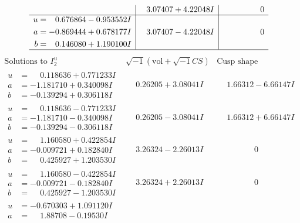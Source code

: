 \documentclass[1p]{elsarticle_modified}
\theoremstyle{definition}
\newcommand{\I}{\sqrt{-1}}
\begin{document}
$$\begin{array}{c|c|c}
 & \phantom{-}3.07407 + 4.22048 I & \phantom{-0.000000 } 0 \\ \hline\begin{aligned}
u &= \phantom{-}0.676864 - 0.953552 I \\
a &= -0.869444 + 0.678177 I \\
b &= \phantom{-}0.146080 + 1.190100 I\end{aligned}
 & \phantom{-}3.07407 - 4.22048 I & \phantom{-0.000000 } 0\\
 \hline 
 \end{array}$$\newpage$$\begin{array}{c|c|c}  
\text{Solutions to }I^u_{2}& \I (\text{vol} + \sqrt{-1}CS) & \text{Cusp shape}\\
 \hline 
\begin{aligned}
u &= \phantom{-}0.118636 + 0.771233 I \\
a &= -1.181710 + 0.340098 I \\
b &= -0.139294 + 0.306118 I\end{aligned}
 & \phantom{-}0.26205 + 3.08041 I & \phantom{-}1.66312 - 6.66147 I \\ \hline\begin{aligned}
u &= \phantom{-}0.118636 - 0.771233 I \\
a &= -1.181710 - 0.340098 I \\
b &= -0.139294 - 0.306118 I\end{aligned}
 & \phantom{-}0.26205 - 3.08041 I & \phantom{-}1.66312 + 6.66147 I \\ \hline\begin{aligned}
u &= \phantom{-}1.160580 + 0.422854 I \\
a &= -0.009721 + 0.182840 I \\
b &= \phantom{-}0.425927 + 1.203530 I\end{aligned}
 & \phantom{-}3.26324 - 2.26013 I & \phantom{-0.000000 } 0 \\ \hline\begin{aligned}
u &= \phantom{-}1.160580 - 0.422854 I \\
a &= -0.009721 - 0.182840 I \\
b &= \phantom{-}0.425927 - 1.203530 I\end{aligned}
 & \phantom{-}3.26324 + 2.26013 I & \phantom{-0.000000 } 0 \\ \hline\begin{aligned}
u &= -0.670303 + 1.091120 I \\
a &= \phantom{-}1.88708 - 0.19530 I \\

\end{aligned}
\end{array}$$
\end{document}
